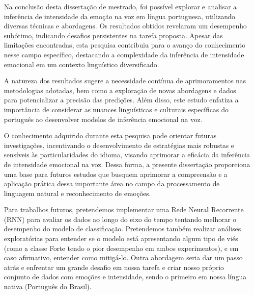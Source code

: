 
Na conclusão desta dissertação de mestrado, foi possível explorar e analisar a inferência de intensidade da emoção na voz em língua portuguesa, utilizando diversas técnicas e abordagens. Os resultados obtidos revelaram um desempenho subótimo, indicando desafios persistentes na tarefa proposta. Apesar das limitações encontradas, esta pesquisa contribuiu para o avanço do conhecimento nesse campo específico, destacando a complexidade da inferência de intensidade emocional em um contexto linguístico diversificado.

A natureza dos resultados sugere a necessidade contínua de aprimoramentos nas metodologias adotadas, bem como a exploração de novas abordagens e dados para potencializar a precisão das predições. Além disso, este estudo enfatiza a importância de considerar as nuances linguísticas e culturais específicas do português ao desenvolver modelos de inferência emocional na voz.

O conhecimento adquirido durante esta pesquisa pode orientar futuras investigações, incentivando o desenvolvimento de estratégias mais robustas e sensíveis às particularidades do idioma, visando aprimorar a eficácia da inferência de intensidade emocional na voz. Dessa forma, a presente dissertação proporciona uma base para futuros estudos que busquem aprimorar a compreensão e a aplicação prática dessa importante área no campo da processamento de linguagem natural e reconhecimento de emoções.

Para trabalhos futuros, pretendemos implementar uma Rede Neural Recorrente (\acrshort{RNN}) para avaliar os dados ao longo do eixo do tempo tentando melhorar o desempenho do modelo de classificação. Pretendemos também realizar análises exploratórias para entender se o modelo está apresentando algum tipo de viés (como a classe Forte tendo o pior desempenho em ambos experimentos), e em caso afirmativo, entender como mitigá-lo. Outra abordagem seria dar um passo atrás e enfrentar um grande desafio em nossa tarefa e criar nosso próprio conjunto de dados com emoções e intensidade, sendo o primeiro em nossa língua nativa (Português do Brasil).
